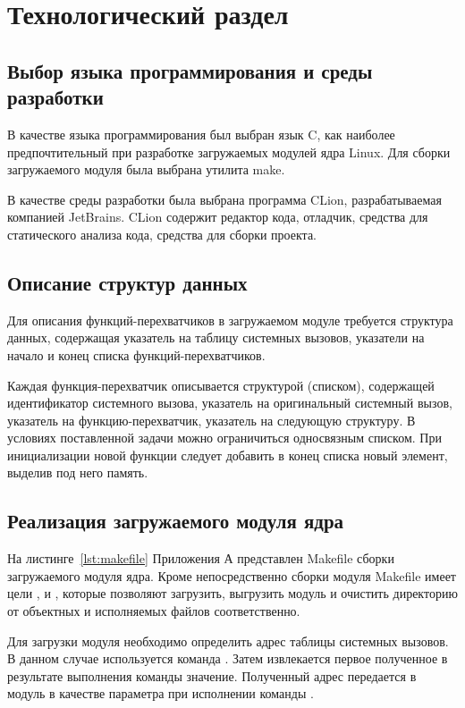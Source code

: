 \chapter{Технологический раздел}

\section{Выбор языка программирования и среды разработки}

В качестве языка программирования был выбран язык C, как наиболее предпочтительный при разработке загружаемых модулей ядра Linux. Для сборки загружаемого модуля была выбрана утилита make.

В качестве среды разработки была выбрана программа CLion, разрабатываемая компанией JetBrains. CLion содержит редактор кода, отладчик, средства для статического анализа кода, средства для сборки проекта.

\section{Описание структур данных}

Для описания функций-перехватчиков в загружаемом модуле требуется структура данных, содержащая указатель на таблицу системных вызовов, указатели на начало и конец списка функций-перехватчиков.

Каждая функция-перехватчик описывается структурой (списком), содержащей идентификатор системного вызова, указатель на оригинальный системный вызов, указатель на функцию-перехватчик, указатель на следующую структуру. В условиях поставленной задачи можно ограничиться односвязным списком. При инициализации новой функции следует добавить в конец списка новый элемент, выделив под него память.

\section{Реализация загружаемого модуля ядра}

На листинге~\ref{lst:makefile} Приложения А представлен Makefile сборки загружаемого модуля ядра. Кроме непосредственно сборки модуля Makefile имеет цели ,  и , которые позволяют загрузить, выгрузить модуль и очистить директорию от объектных и исполняемых файлов соответственно.

Для загрузки модуля необходимо определить адрес таблицы системных вызовов. В данном случае используется команда . Затем извлекается первое полученное в результате выполнения команды значение. Полученный адрес передается в модуль в качестве параметра  при исполнении команды .


